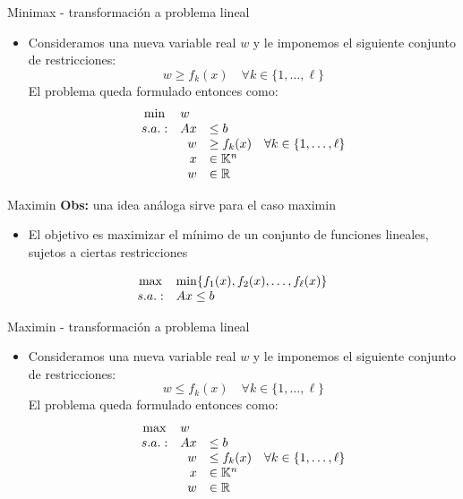 \documentclass[10pt, aspectratio=169]{beamer}
\begin{document}
\begin{frame}{Minimax - transformación a problema lineal}
    \begin{itemize}
        \item Consideramos una nueva variable real $w$ y le imponemos el siguiente conjunto de restricciones:
        \[w \geq f_k(x) \quad \forall k\in\{1,\dots,\ell\} \]
        El problema queda formulado entonces como:
        \[\begin{array}{crl}
        \min & \multicolumn{2}{l}{w}\\
        s.a.: & Ax &\leq b \\
         & w &\geq f_k(x) \quad \forall k\in\{1,\dots,\ell\} \\
         & x &\in \mathbb{K}^n\\
         & w &\in \mathbb{R}
        \end{array}
        \]
    \end{itemize}
\end{frame}

\begin{frame}{Maximin}
    \textbf{Obs:} una idea análoga sirve para el caso maximin

    \begin{itemize}
        \item El objetivo es maximizar el mínimo de un conjunto de funciones lineales, sujetos a ciertas restricciones
    \end{itemize}
    \[\begin{array}{crl}
        \max & \multicolumn{2}{l}{\min\{f_1(x), f_2(x),\dots,f_\ell(x)\}}\\
        s.a.: & Ax\leq b \\
    \end{array}
    \]
\end{frame}


\begin{frame}{Maximin - transformación a problema lineal}
    \begin{itemize}
        \item Consideramos una nueva variable real $w$ y le imponemos el siguiente conjunto de restricciones:
        \[w \leq f_k(x) \quad \forall k\in\{1,\dots,\ell\} \]
        El problema queda formulado entonces como:
        \[\begin{array}{crl}
        \max & \multicolumn{2}{l}{w}\\
        s.a.: & Ax &\leq b \\
         & w &\leq f_k(x) \quad \forall k\in\{1,\dots,\ell\} \\
         & x &\in \mathbb{K}^n\\
         & w &\in \mathbb{R}
        \end{array}
        \]
    \end{itemize}
\end{frame}
\end{document}
